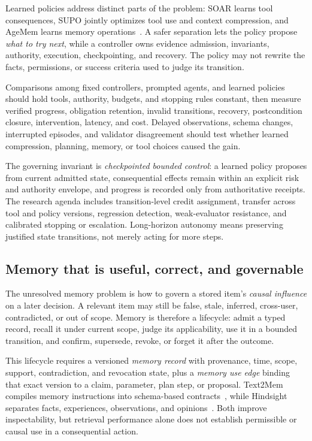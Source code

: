 Learned policies address distinct parts of the problem: SOAR learns tool consequences, SUPO jointly optimizes tool use and context compression, and AgeMem learns memory operations~\cite{li2026soar,lu2026supo,yu2026agemem}. A safer separation lets the policy propose \emph{what to try next}, while a controller owns evidence admission, invariants, authority, execution, checkpointing, and recovery. The policy may not rewrite the facts, permissions, or success criteria used to judge its transition.

Comparisons among fixed controllers, prompted agents, and learned policies should hold tools, authority, budgets, and stopping rules constant, then measure verified progress, obligation retention, invalid transitions, recovery, postcondition closure, intervention, latency, and cost. Delayed observations, schema changes, interrupted episodes, and validator disagreement should test whether learned compression, planning, memory, or tool choices caused the gain.

The governing invariant is \emph{checkpointed bounded control}: a learned policy proposes from current admitted state, consequential effects remain within an explicit risk and authority envelope, and progress is recorded only from authoritative receipts. The research agenda includes transition-level credit assignment, transfer across tool and policy versions, regression detection, weak-evaluator resistance, and calibrated stopping or escalation. Long-horizon autonomy means preserving justified state transitions, not merely acting for more steps.

\subsection{Memory that is useful, correct, and governable}

The unresolved memory problem is how to govern a stored item's \emph{causal influence} on a later decision. A relevant item may still be false, stale, inferred, cross-user, contradicted, or out of scope. Memory is therefore a lifecycle: admit a typed record, recall it under current scope, judge its applicability, use it in a bounded transition, and confirm, supersede, revoke, or forget it after the outcome.

This lifecycle requires a versioned \emph{memory record} with provenance, time, scope, support, contradiction, and revocation state, plus a \emph{memory use edge} binding that exact version to a claim, parameter, plan step, or proposal. Text2Mem compiles memory instructions into schema-based contracts~\cite{wang2026text2mem}, while Hindsight separates facts, experiences, observations, and opinions~\cite{latimer2026hindsight}. Both improve inspectability, but retrieval performance alone does not establish permissible or causal use in a consequential action.

